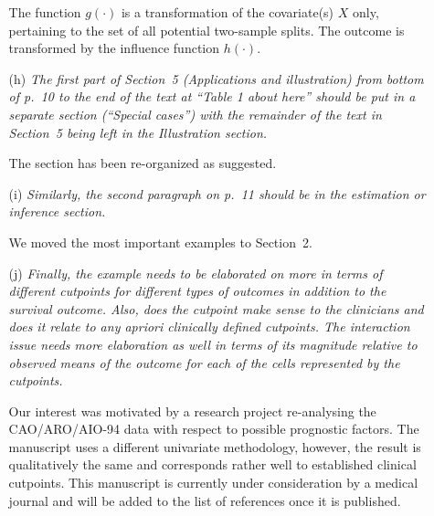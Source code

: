\documentclass[11pt,a4paper]{article}
\begin{document}
\begin{enumerate}
\begin{itemize}
	       The function $g(\cdot)$ is a transformation of the covariate(s) $X$
	       only, pertaining to the set of all potential two-sample splits.
	       The outcome is transformed by the influence function $h(\cdot)$.
	       
    \item[(h)] \textit{The first part of Section~5 (Applications and illustration)
               from bottom of p.~10 to the end of the text at ``Table 1 about here''
	       should be put in a separate section (``Special cases'') with the
	       remainder of the text in Section~5 being left in the Illustration
	       section.}
	       
	       The section has been re-organized as suggested.
	       
    \item[(i)] \textit{Similarly, the second paragraph on p.~11 should be in the
               estimation or inference section.}
	       
	       We moved the most important examples to Section~2.
	       
    \item[(j)] \textit{Finally, the example needs to be elaborated on more in terms
               of different cutpoints for different types of outcomes in addition to
	       the survival outcome. Also, does the cutpoint make sense to the
	       clinicians and does it relate to any apriori clinically defined
	       cutpoints. The interaction issue needs more elaboration as well in
	       terms of its magnitude relative to observed means of the outcome for
	       each of the cells represented by the cutpoints.}
	       
Our interest was motivated by a research project re-analysing the CAO/ARO/AIO-94
data with respect to possible prognostic factors. The manuscript uses 
a different univariate methodology, however, the result is qualitatively the same
and corresponds rather well to established clinical cutpoints. 
This manuscript is currently under consideration by a medical journal and will
be added to the list of references once it is published.

\end{itemize}
  
\end{enumerate}
\end{document}
